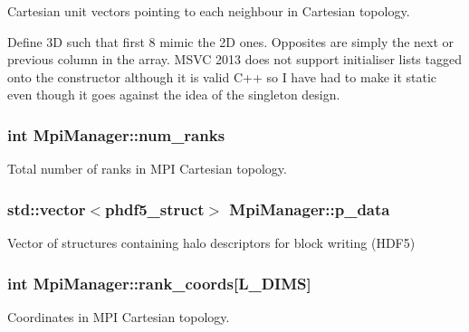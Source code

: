 Cartesian unit vectors pointing to each neighbour in Cartesian topology. 

Define 3D such that first 8 mimic the 2D ones. Opposites are simply the next or previous column in the array. M\+S\+VC 2013 does not support initialiser lists tagged onto the constructor although it is valid C++ so I have had to make it static even though it goes against the idea of the singleton design. 
\subsubsection[{\texorpdfstring{num\+\_\+ranks}{num_ranks}}]{\setlength{\rightskip}{0pt plus 5cm}int Mpi\+Manager\+::num\+\_\+ranks}\hypertarget{class_mpi_manager_af5156a5e4519f43230b6b84792464e48}{}\label{class_mpi_manager_af5156a5e4519f43230b6b84792464e48}


Total number of ranks in M\+PI Cartesian topology. 

\subsubsection[{\texorpdfstring{p\+\_\+data}{p_data}}]{\setlength{\rightskip}{0pt plus 5cm}std\+::vector$<${\bf phdf5\+\_\+struct}$>$ Mpi\+Manager\+::p\+\_\+data}\hypertarget{class_mpi_manager_a03972530e718d5b0a7f119e9c6132179}{}\label{class_mpi_manager_a03972530e718d5b0a7f119e9c6132179}


Vector of structures containing halo descriptors for block writing (H\+D\+F5) 

\subsubsection[{\texorpdfstring{rank\+\_\+coords}{rank_coords}}]{\setlength{\rightskip}{0pt plus 5cm}int Mpi\+Manager\+::rank\+\_\+coords\mbox{[}{\bf L\+\_\+\+D\+I\+MS}\mbox{]}}\hypertarget{class_mpi_manager_a54a3ad1d90d1508ebc82f81655d917f8}{}\label{class_mpi_manager_a54a3ad1d90d1508ebc82f81655d917f8}


Coordinates in M\+PI Cartesian topology. 

